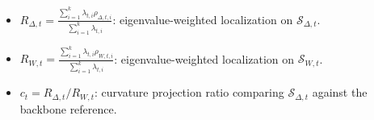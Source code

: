 \documentclass{article}
\begin{document}
\begin{itemize}


\item $R_{\Delta,t}=\frac{\sum_{i=1}^k\lambda_{t,i}\rho_{\Delta,t,i}}{\sum_{i=1}^k\lambda_{t,i}}$: eigenvalue-weighted localization on $\mathcal S_{\Delta,t}$.
\item $R_{W,t}=\frac{\sum_{i=1}^k\lambda_{t,i}\rho_{W,t,i}}{\sum_{i=1}^k\lambda_{t,i}}$: eigenvalue-weighted localization on $\mathcal S_{W,t}$.
\item $c_t=R_{\Delta,t}/R_{W,t}$: curvature projection ratio comparing $\mathcal S_{\Delta,t}$ against the backbone reference. 
\end{itemize}
\end{document}
